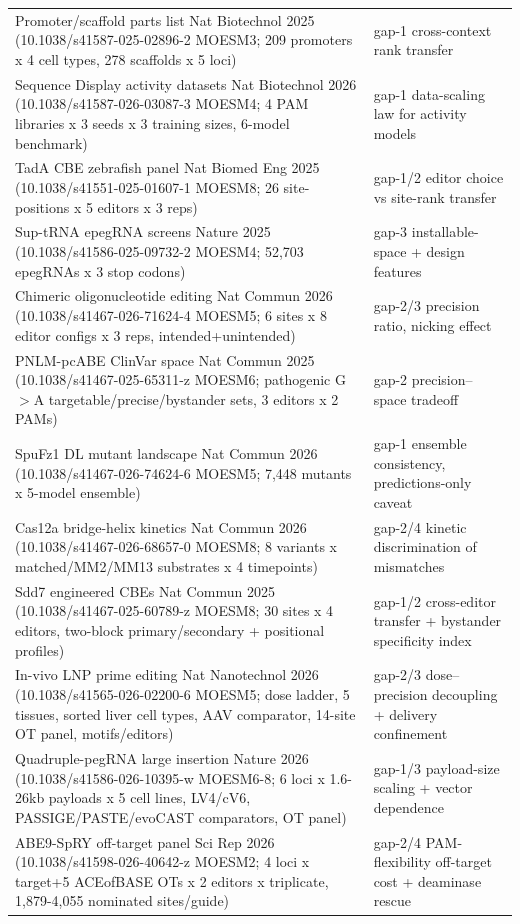 \begin{longtable}{@{}p{}p{}@{}}
Promoter/scaffold parts list Nat Biotechnol 2025 (10.1038/s41587-025-02896-2 MOESM3; 209 promoters x 4 cell types, 278 scaffolds x 5 loci) & gap-1 cross-context rank transfer \\
Sequence Display activity datasets Nat Biotechnol 2026 (10.1038/s41587-026-03087-3 MOESM4; 4 PAM libraries x 3 seeds x 3 training sizes, 6-model benchmark) & gap-1 data-scaling law for activity models \\
TadA CBE zebrafish panel Nat Biomed Eng 2025 (10.1038/s41551-025-01607-1 MOESM8; 26 site-positions x 5 editors x 3 reps) & gap-1/2 editor choice vs site-rank transfer \\
Sup-tRNA epegRNA screens Nature 2025 (10.1038/s41586-025-09732-2 MOESM4; 52,703 epegRNAs x 3 stop codons) & gap-3 installable-space + design features \\
Chimeric oligonucleotide editing Nat Commun 2026 (10.1038/s41467-026-71624-4 MOESM5; 6 sites x 8 editor configs x 3 reps, intended+unintended) & gap-2/3 precision ratio, nicking effect \\
PNLM-pcABE ClinVar space Nat Commun 2025 (10.1038/s41467-025-65311-z MOESM6; pathogenic G$>$A targetable/precise/bystander sets, 3 editors x 2 PAMs) & gap-2 precision--space tradeoff \\
SpuFz1 DL mutant landscape Nat Commun 2026 (10.1038/s41467-026-74624-6 MOESM5; 7,448 mutants x 5-model ensemble) & gap-1 ensemble consistency, predictions-only caveat \\
Cas12a bridge-helix kinetics Nat Commun 2026 (10.1038/s41467-026-68657-0 MOESM8; 8 variants x matched/MM2/MM13 substrates x 4 timepoints) & gap-2/4 kinetic discrimination of mismatches \\
Sdd7 engineered CBEs Nat Commun 2025 (10.1038/s41467-025-60789-z MOESM8; 30 sites x 4 editors, two-block primary/secondary + positional profiles) & gap-1/2 cross-editor transfer + bystander specificity index \\
In-vivo LNP prime editing Nat Nanotechnol 2026 (10.1038/s41565-026-02200-6 MOESM5; dose ladder, 5 tissues, sorted liver cell types, AAV comparator, 14-site OT panel, motifs/editors) & gap-2/3 dose--precision decoupling + delivery confinement \\
Quadruple-pegRNA large insertion Nature 2026 (10.1038/s41586-026-10395-w MOESM6-8; 6 loci x 1.6-26kb payloads x 5 cell lines, LV4/cV6, PASSIGE/PASTE/evoCAST comparators, OT panel) & gap-1/3 payload-size scaling + vector dependence \\
ABE9-SpRY off-target panel Sci Rep 2026 (10.1038/s41598-026-40642-z MOESM2; 4 loci x target+5 ACEofBASE OTs x 2 editors x triplicate, 1,879-4,055 nominated sites/guide) & gap-2/4 PAM-flexibility off-target cost + deaminase rescue \\

\end{longtable}
